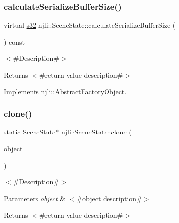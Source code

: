 \subsubsection{\texorpdfstring{calculate\+Serialize\+Buffer\+Size()}{calculateSerializeBufferSize()}}
{\footnotesize\ttfamily virtual \mbox{\hyperlink{_util_8h_aa62c75d314a0d1f37f79c4b73b2292e2}{s32}} njli\+::\+Scene\+State\+::calculate\+Serialize\+Buffer\+Size (\begin{DoxyParamCaption}{ }\end{DoxyParamCaption}) const\hspace{0.3cm}{\ttfamily [virtual]}}

$<$\#\+Description\#$>$

\begin{DoxyReturn}{Returns}
$<$\#return value description\#$>$ 
\end{DoxyReturn}


Implements \mbox{\hyperlink{classnjli_1_1_abstract_factory_object_a4763d05bc9dc37c559111f8bb30e1dd8}{njli\+::\+Abstract\+Factory\+Object}}.

\mbox{\label{classnjli_1_1_scene_state_ade44964690e66b33e30c9523ebe946f5}} 
\subsubsection{\texorpdfstring{clone()}{clone()}}
{\footnotesize\ttfamily static \mbox{\hyperlink{classnjli_1_1_scene_state}{Scene\+State}}$\ast$ njli\+::\+Scene\+State\+::clone (\begin{DoxyParamCaption}\item[{const \mbox{\hyperlink{classnjli_1_1_scene_state}{Scene\+State}} \&}]{object }\end{DoxyParamCaption})\hspace{0.3cm}{\ttfamily [static]}}

$<$\#\+Description\#$>$


\begin{DoxyParams}{Parameters}
{\em object} & $<$\#object description\#$>$\\
\hline
\end{DoxyParams}
\begin{DoxyReturn}{Returns}
$<$\#return value description\#$>$ 
\end{DoxyReturn}
\mbox{\label{classnjli_1_1_scene_state_ac9a25b582796ba60d15b09afc316b1ef}} 
